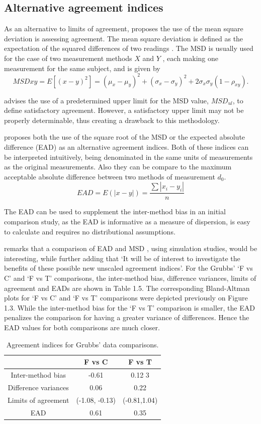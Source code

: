 \documentclass[12pt, a4paper]{report}
\theoremstyle{plain}
\theoremstyle{definition}
\theoremstyle{remark}
\begin{document}
\subsection{Alternative agreement indices}
As an alternative to limits of agreement, \citet{lin2002} proposes the use of
the mean square deviation is assessing agreement. The mean square
deviation is defined as the expectation of the squared differences
of two readings . The MSD is usually used for the case of two
measurement methods $X$ and $Y$ , each making one measurement for
the same subject, and is given by
\[
MSDxy = E[(x - y)^2]  = (\mu_{x} - \mu_{y})^2 + (\sigma_{x} -
\sigma_{y})^2 + 2\sigma_{x}\sigma_{y}(1-\rho_{xy}).
\]


\citet{Barnhart} advises the use of a predetermined upper limit
for the MSD value, $MSD_{ul}$, to define satisfactory agreement.
However, a satisfactory upper limit may not be properly
determinable, thus creating a drawback to this methodology.


\citet{Barnhart} proposes both the use of the square root of the
MSD or the expected absolute difference (EAD) as an alternative agreement indices. Both of these indices can be interpreted intuitively, being denominated in the same units of measurements as the original
measurements. Also they can be compare to the maximum acceptable
absolute difference between two methods of measurement $d_{0}$.
\[
EAD = E(|x - y|) = \frac{\sum |x_{i}- y_{i}|}{n}
\]

The EAD can be used to supplement the inter-method bias in an
initial comparison study, as the EAD is informative as a measure
of dispersion, is easy to calculate and requires no distributional
assumptions.

\citet{Barnhart} remarks that a comparison of EAD and MSD , using
simulation studies, would be interesting, while further adding
that `It will be of interest to investigate the benefits of these
possible new unscaled agreement indices'. For the Grubbs' `F vs C' and `F vs T' comparisons, the inter-method bias, difference variances, limits of agreement and EADs are shown
in Table 1.5. The corresponding Bland-Altman plots for `F vs C' and `F vs T' comparisons were depicted previously on Figure 1.3. While the inter-method bias for the `F vs T' comparison is smaller, the EAD penalizes the comparison for having a greater variance of differences. Hence the EAD values for both comparisons are much closer.
\begin{table}[ht]
\begin{center}
\begin{tabular}{|c|c|c|}
  \hline
 & F vs C & F vs T  \\
  \hline
Inter-method bias & -0.61 & 0.12 3 \\
Difference variances & 0.06 & 0.22  \\
Limits of agreement & (-1.08,	-0.13) & (-0.81,1.04) \\
  EAD & 0.61 & 0.35  \\
   \hline
\end{tabular}
\caption{Agreement indices for Grubbs' data comparisons.}
\end{center}
\end{table}
\end{document}
